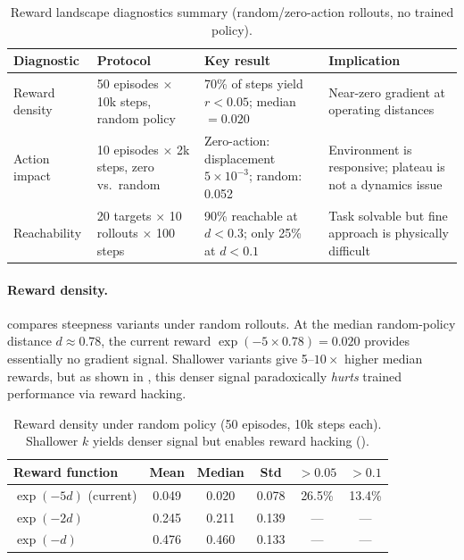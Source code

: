 \documentclass[11pt]{article}
\begin{document}
\begin{table}[H]
  \centering
  \small
  \renewcommand{\arraystretch}{1.3}
  \caption{Reward landscape diagnostics summary (random/zero-action rollouts, no trained policy).}
  \label{tab:diagnostics-summary}
  \begin{tabular}{@{} p{1.9cm} p{3.1cm} p{4.5cm} p{4.5cm} @{}}
    \toprule
    \textbf{Diagnostic} & \textbf{Protocol} & \textbf{Key result} & \textbf{Implication} \\
    \midrule
    Reward density
      & 50 episodes $\times$ 10k steps, random policy
      & 70\% of steps yield $r < 0.05$; median $= 0.020$
      & Near-zero gradient at operating distances \\
    \addlinespace
    Action impact
      & 10 episodes $\times$ 2k steps, zero vs.\ random
      & Zero-action: displacement $5 \times 10^{-3}$; random: 0.052
      & Environment is responsive; plateau is not a dynamics issue \\
    \addlinespace
    Reachability
      & 20 targets $\times$ 10 rollouts $\times$ 100 steps
      & 90\% reachable at $d{<}0.3$; only 25\% at $d{<}0.1$
      & Task solvable but fine approach is physically difficult \\
    \bottomrule
  \end{tabular}
\end{table}

\paragraph{Reward density.}
 compares steepness variants under random rollouts.
At the median random-policy distance $d \approx 0.78$, the current reward $\exp(-5 \times 0.78) = 0.020$ provides essentially no gradient signal.
Shallower variants give 5--$10\times$ higher median rewards, but as shown in , this denser signal paradoxically \emph{hurts} trained performance via reward hacking.

\begin{table}[H]
  \centering
  \small
  \renewcommand{\arraystretch}{1.3}
  \caption{Reward density under random policy (50 episodes, 10k steps each). Shallower $k$ yields denser signal but enables reward hacking ().}
  \label{tab:reward-landscape}
  \begin{tabular}{@{}lccccc@{}}
    \toprule
    \textbf{Reward function} & \textbf{Mean} & \textbf{Median} & \textbf{Std} & $\boldsymbol{>0.05}$ & $\boldsymbol{>0.1}$ \\
    \midrule
    $\exp(-5d)$ (current)  & 0.049 & 0.020 & 0.078 & 26.5\% & 13.4\% \\
    $\exp(-2d)$            & 0.245 & 0.211 & 0.139 & ---    & ---    \\
    $\exp(-d)$             & 0.476 & 0.460 & 0.133 & ---    & ---    \\
    \bottomrule
  \end{tabular}
\end{table}
\end{document}
